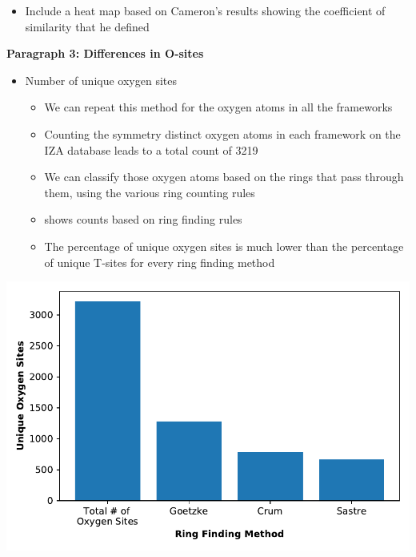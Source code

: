 \documentclass[11pt]{article}
\begin{document}
\begin{itemize}
\item Include a heat map based on Cameron's results showing the coefficient of similarity that he defined
\end{itemize}

\textbf{\textbf{Paragraph 3: Differences in O-sites}}
\begin{itemize}
\item Number of unique oxygen sites
\begin{itemize}
\item We can repeat this method for the oxygen atoms in all the frameworks
\item Counting the symmetry distinct oxygen atoms in each framework on the IZA database leads to a total count of 3219
\item We can classify those oxygen atoms based on the rings that pass through them, using the various ring counting rules
\item {} shows counts based on ring finding rules
\item The percentage of unique oxygen sites is much lower than the percentage of unique T-sites for every ring finding method
\end{itemize}
\end{itemize}

\begin{center}
\includegraphics[width=.6\textwidth]{../figures/completed-figures/unique-os.pdf}
\end{center}
\end{document}
